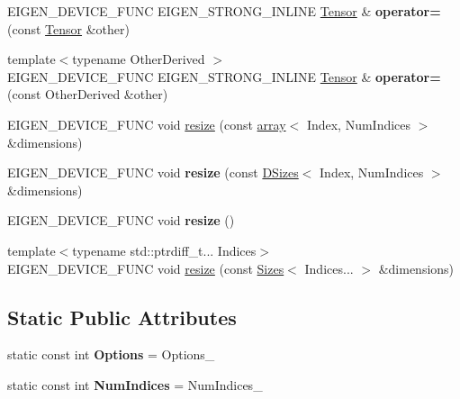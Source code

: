 \begin{DoxyCompactItemize}
E\+I\+G\+E\+N\+\_\+\+D\+E\+V\+I\+C\+E\+\_\+\+F\+U\+NC E\+I\+G\+E\+N\+\_\+\+S\+T\+R\+O\+N\+G\+\_\+\+I\+N\+L\+I\+NE \hyperlink{class_eigen_1_1_tensor}{Tensor} \& {\bfseries operator=} (const \hyperlink{class_eigen_1_1_tensor}{Tensor} \&other)
\item 
\mbox{\label{class_eigen_1_1_tensor_a3f5b5cb98da5ee3c9ee3e09abe9e73fd}} 
{\footnotesize template$<$typename Other\+Derived $>$ }\\E\+I\+G\+E\+N\+\_\+\+D\+E\+V\+I\+C\+E\+\_\+\+F\+U\+NC E\+I\+G\+E\+N\+\_\+\+S\+T\+R\+O\+N\+G\+\_\+\+I\+N\+L\+I\+NE \hyperlink{class_eigen_1_1_tensor}{Tensor} \& {\bfseries operator=} (const Other\+Derived \&other)
\item 
E\+I\+G\+E\+N\+\_\+\+D\+E\+V\+I\+C\+E\+\_\+\+F\+U\+NC void \hyperlink{class_eigen_1_1_tensor_a5ab1ec6dc9b05d5e4db3600bc9d2cc6b}{resize} (const \hyperlink{class_eigen_1_1array}{array}$<$ Index, Num\+Indices $>$ \&dimensions)
\item 
\mbox{\label{class_eigen_1_1_tensor_a78f1708920dfe6d76bb547f6f68a3ce2}} 
E\+I\+G\+E\+N\+\_\+\+D\+E\+V\+I\+C\+E\+\_\+\+F\+U\+NC void {\bfseries resize} (const \hyperlink{struct_eigen_1_1_d_sizes}{D\+Sizes}$<$ Index, Num\+Indices $>$ \&dimensions)
\item 
\mbox{\label{class_eigen_1_1_tensor_ab4b4f5f9a27507f115c0399ed7e7b398}} 
E\+I\+G\+E\+N\+\_\+\+D\+E\+V\+I\+C\+E\+\_\+\+F\+U\+NC void {\bfseries resize} ()
\item 
{\footnotesize template$<$typename std\+::ptrdiff\+\_\+t... Indices$>$ }\\E\+I\+G\+E\+N\+\_\+\+D\+E\+V\+I\+C\+E\+\_\+\+F\+U\+NC void \hyperlink{class_eigen_1_1_tensor_a4f637a19784e5d0391882bd9fab0917e}{resize} (const \hyperlink{struct_eigen_1_1_sizes}{Sizes}$<$ Indices... $>$ \&dimensions)
\end{DoxyCompactItemize}
\subsection*{Static Public Attributes}
\begin{DoxyCompactItemize}
\item 
\mbox{\label{class_eigen_1_1_tensor_a89b2e78917e4d9830166020d9b88f59d}} 
static const int {\bfseries Options} = Options\+\_\+
\item 
\mbox{\label{class_eigen_1_1_tensor_ab143b2807c4ae2541855fb46073b1464}} 
static const int {\bfseries Num\+Indices} = Num\+Indices\+\_\+
\end{DoxyCompactItemize}
